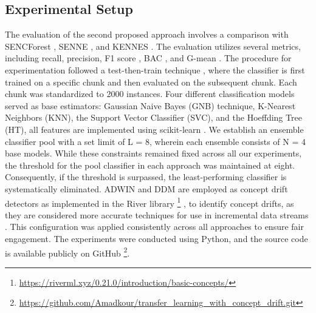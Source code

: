 \subsection{Experimental Setup}
\label{sec:setup}
The evaluation of the second proposed approach involves a comparison with SENCForest \cite{mu2017classification}, SENNE \cite{yang2021concept}, and KENNES \cite{zhang2022knnens}. The evaluation utilizes several metrics, including recall, precision, F1 score \cite{sasaki2007truth}, BAC \cite{brodersen2010balanced}, and G-mean \cite{kubat1997addressing}. The procedure for experimentation followed a test-then-train technique \cite{krawczyk2017ensemble}, where the classifier is first trained on a specific chunk and then evaluated on the subsequent chunk. Each chunk was standardized to 2000 instances. Four different classification models served as base estimators: Gaussian Naive Bayes (GNB) technique, K-Nearest Neighbors (KNN), the Support Vector Classifier (SVC), and the Hoeffding Tree (HT), all features are implemented using scikit-learn \cite{ksieniewicz2022stream}. We establish an ensemble classifier pool with a set limit of L = 8, wherein each ensemble consists of N = 4 base models. While these constraints remained fixed across all our experiments, the threshold for the pool classifier in each approach was maintained at eight. Consequently, if the threshold is surpassed, the least-performing classifier is systematically eliminated. ADWIN \cite{adams2023explainable} and DDM \cite{gama2004learning} are employed as concept drift detectors as implemented in the River library \footnote{\url{https://riverml.xyz/0.21.0/introduction/basic-concepts/}} , to identify concept drifts, as they are considered more accurate techniques for use in incremental data streams \cite{gama2004learning,adams2023explainable,madkour2023historical,baena2006early}. This configuration was applied consistently across all approaches to ensure fair engagement. The experiments were conducted using Python, and the source code is available publicly on GitHub \footnote{\url{https://github.com/Amadkour/transfer_learning_with_concept_drift.git}}.

